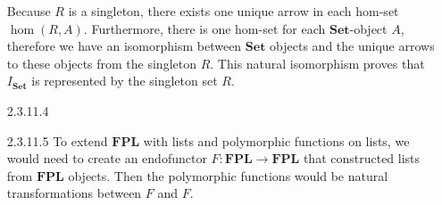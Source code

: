 \documentclass{article}
\newcommand{\cset}{\mathbf{Set}}
\newcommand{\fhom}{\mathbf{hom}}
\newcommand{\fpl}{\mathbf{FPL}}
\begin{document}
\begin{enumerate}
\begin{center}
  \end{center}
  
  Because $R$ is a singleton, there exists one unique arrow in each hom-set $\hom(R,A)$.
  Furthermore, there is one hom-set for each $\cset$-object $A$, therefore we have an isomorphism between $\cset$ objects and the unique arrows to these objects from the singleton $R$.
  This natural isomorphism proves that $I_\cset$ is represented by the singleton set $R$.

\newpage
\item [2.3.11.4]
\item[]
\item [2.3.11.5] To extend $\fpl$ with lists and polymorphic functions on lists, we would need to create an endofunctor $F : \fpl \rightarrow \fpl$ that constructed lists from $\fpl$ objects.
  Then the polymorphic functions would be natural transformations between $F$ and $F$.

\end{enumerate}
\end{document}
